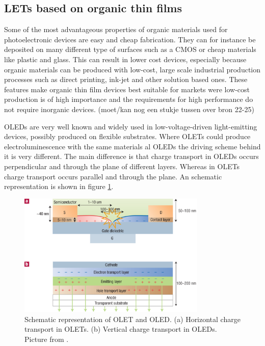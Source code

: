 \subsection{LETs based on organic thin films}\label{sec:thinfilms} %
Some of the most advantageous properties of organic materials used for photoelectronic devices are easy and cheap fabrication. They can for instance be deposited on many different type of surfaces such as a CMOS or cheap materials like plastic and glass. This can result in lower cost devices, especially because organic materials can be produced with low-cost, large scale industrial production processes such as direct printing, ink-jet and other solution based ones. These features make organic thin film devices best suitable for markets were low-cost production is of high importance and the requirements for high performance do not require inorganic devices. (moet/kan nog een stukje tussen over bron 22-25)

OLEDs are very well known and widely used in low-voltage-driven light-emitting devices, possibly produced on flexible substrates. Where OLETs could produce electroluminescence with the same materials al OLEDs the driving scheme behind it is very different. The main difference is that charge transport in OLEDs occurs perpendicular and through the plane of different layers. Whereas in OLETs charge transport occurs parallel and through the plane. An schematic representation is shown in figure \ref{fig:thinfilms}.

\begin{figure}[!ht]
 \begin{center}
  \includegraphics[width=0.8\textwidth]{fig_2}
  \caption{Schematic representation of OLET and OLED. (a) Horizontal charge transport in OLETs. (b) Vertical charge transport in OLEDs. Picture from \citet{Muccini}.}
  \label{fig:thinfilms}
 \end{center}
\end{figure}

